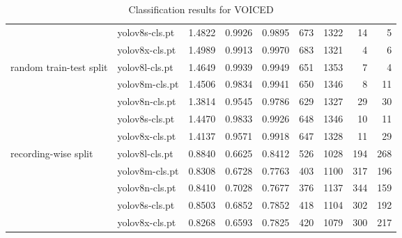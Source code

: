 \begin{table}
\begin{tabular}{llrrrrrrr}
			 & yolov8s-cls.pt & 1.4822 & 0.9926 & 0.9895 & 673 & 1322 & 14 & 5 \\
			 & yolov8x-cls.pt & 1.4989 & 0.9913 & 0.9970 & 683 & 1321 & 4 & 6 \\
			\midrule
			\multirow{5}{10em}{random train-test split} & yolov8l-cls.pt & 1.4649 & 0.9939 & 0.9949 & 651 & 1353 & 7 & 4 \\
			 & yolov8m-cls.pt & 1.4506 & 0.9834 & 0.9941 & 650 & 1346 & 8 & 11 \\
			 & yolov8n-cls.pt & 1.3814 & 0.9545 & 0.9786 & 629 & 1327 & 29 & 30 \\
			 & yolov8s-cls.pt & 1.4470 & 0.9833 & 0.9926 & 648 & 1346 & 10 & 11 \\
			 & yolov8x-cls.pt & 1.4137 & 0.9571 & 0.9918 & 647 & 1328 & 11 & 29 \\
			\midrule
			\multirow{5}{10em}{recording-wise split} & yolov8l-cls.pt & 0.8840 & 0.6625 & 0.8412 & 526 & 1028 & 194 & 268 \\
			 & yolov8m-cls.pt & 0.8308 & 0.6728 & 0.7763 & 403 & 1100 & 317 & 196 \\
			 & yolov8n-cls.pt & 0.8410 & 0.7028 & 0.7677 & 376 & 1137 & 344 & 159 \\
			 & yolov8s-cls.pt & 0.8503 & 0.6852 & 0.7852 & 418 & 1104 & 302 & 192 \\
			 & yolov8x-cls.pt & 0.8268 & 0.6593 & 0.7825 & 420 & 1079 & 300 & 217 \\
        \bottomrule
    \end{tabular}
    \caption{Classification results for VOICED}
    \label{tab:voiced_results}
\end{table}